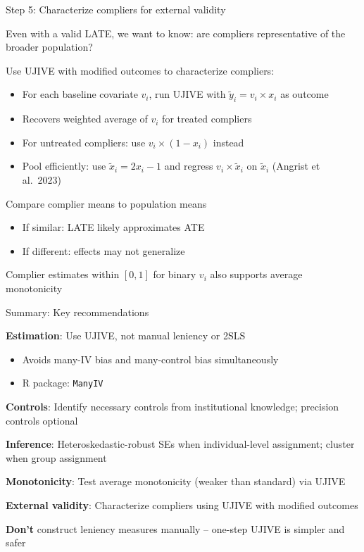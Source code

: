 \documentclass[notes,11pt, aspectratio=169]{beamer}
\newenvironment{wideitemize}{\itemize\addtolength{\itemsep}{10pt}}{\enditemize}
\begin{document}
\begin{frame}{Step 5: Characterize compliers for external validity}
  \begin{wideitemize}
  \item Even with a valid LATE, we want to know: are compliers representative of the broader population?
  \item Use UJIVE with modified outcomes to characterize compliers:
    \begin{itemize}
    \item For each baseline covariate $v_{i}$, run UJIVE with $\tilde{y}_{i} = v_{i} \times x_{i}$ as outcome
    \item Recovers weighted average of $v_{i}$ for treated compliers
    \item For untreated compliers: use $v_{i} \times (1 - x_{i})$ instead
    \item Pool efficiently: use $\tilde{x}_{i} = 2x_{i} - 1$ and regress $v_{i} \times \tilde{x}_{i}$ on $\tilde{x}_{i}$ (Angrist et al.\ 2023)
    \end{itemize}
  \item Compare complier means to population means
    \begin{itemize}
    \item If similar: LATE likely approximates ATE
    \item If different: effects may not generalize
    \end{itemize}
  \item Complier estimates within $[0,1]$ for binary $v_{i}$ also supports average monotonicity
  \end{wideitemize}
\end{frame}


\begin{frame}{Summary: Key recommendations}
  \begin{wideitemize}
  \item \textbf{Estimation}: Use UJIVE, not manual leniency or 2SLS
    \begin{itemize}
    \item Avoids many-IV bias and many-control bias simultaneously
    \item R package: \texttt{ManyIV}
    \end{itemize}
  \item \textbf{Controls}: Identify necessary controls from institutional knowledge; precision controls optional
  \item \textbf{Inference}: Heteroskedastic-robust SEs when individual-level assignment; cluster when group assignment
  \item \textbf{Monotonicity}: Test average monotonicity (weaker than standard) via UJIVE
  \item \textbf{External validity}: Characterize compliers using UJIVE with modified outcomes
  \item \textbf{Don't} construct leniency measures manually -- one-step UJIVE is simpler and safer
  \end{wideitemize}
\end{frame}
\end{document}
